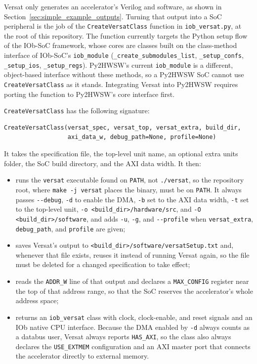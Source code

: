 %

Versat only generates an accelerator's Verilog and software, as shown in Section~\ref{sec:simple_example_outputs}. Turning that output into a SoC peripheral is the job of the \texttt{CreateVersatClass} function in \texttt{iob\_versat.py}, at the root of this repository. The function currently targets the Python setup flow of the IOb-SoC framework, whose cores are classes built on the class-method interface of IOb-SoC's \texttt{iob\_module} (\texttt{\_create\_submodules\_list}, \texttt{\_setup\_confs}, \texttt{\_setup\_ios}, \texttt{\_setup\_regs}). Py2HWSW's current \texttt{iob\_module} is a different, object-based interface without these methods, so a Py2HWSW SoC cannot use \texttt{CreateVersatClass} as it stands. Integrating Versat into Py2HWSW requires porting the function to Py2HWSW's core interface first.

\texttt{CreateVersatClass} has the following signature:

\begin{lstlisting}[caption={iob\_versat.py}]
CreateVersatClass(versat_spec, versat_top, versat_extra, build_dir,
                  axi_data_w, debug_path=None, profile=None)
\end{lstlisting}

It takes the specification file, the top-level unit name, an optional extra units folder, the SoC build directory, and the AXI data width. It then:

\begin{itemize}
  \itemsep-0.5em
  \item runs the \texttt{versat} executable found on \texttt{PATH}, not \texttt{./versat}, so the repository root, where \texttt{make -j versat} places the binary, must be on \texttt{PATH}. It always passes \texttt{-{}-debug}, \texttt{-d} to enable the DMA, \texttt{-b} set to the AXI data width, \texttt{-t} set to the top-level unit, \texttt{-o <build\_dir>/hardware/src}, and \texttt{-O <build\_dir>/software}, and adds \texttt{-u}, \texttt{-g}, and \texttt{-{}-profile} when \texttt{versat\_extra}, \texttt{debug\_path}, and \texttt{profile} are given;
  \item saves Versat's output to \texttt{<build\_dir>/software/versatSetup.txt} and, whenever that file exists, reuses it instead of running Versat again, so the file must be deleted for a changed specification to take effect;
  \item reads the \texttt{ADDR\_W} line of that output and declares a \texttt{MAX\_CONFIG} register near the top of that address range, so that the SoC reserves the accelerator's whole address space;
  \item returns an \texttt{iob\_versat} class with clock, clock-enable, and reset signals and an IOb native CPU interface. Because the DMA enabled by \texttt{-d} always counts as a databus user, Versat always reports \texttt{HAS\_AXI}, so the class also always declares the \texttt{USE\_EXTMEM} configuration and an AXI master port that connects the accelerator directly to external memory.
\end{itemize}

